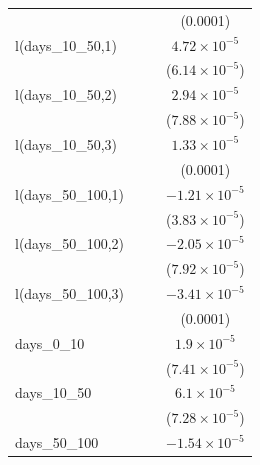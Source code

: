 \begin{tabular}{lccc}
                                          &          &                       & (0.0001)\\   
   l(days\_10\_50,1)                      &          &                       & $4.72\times 10^{-5}$\\    
                                          &          &                       & ($6.14\times 10^{-5}$)\\    
   l(days\_10\_50,2)                      &          &                       & $2.94\times 10^{-5}$\\    
                                          &          &                       & ($7.88\times 10^{-5}$)\\    
   l(days\_10\_50,3)                      &          &                       & $1.33\times 10^{-5}$\\    
                                          &          &                       & (0.0001)\\   
   l(days\_50\_100,1)                     &          &                       & $-1.21\times 10^{-5}$\\    
                                          &          &                       & ($3.83\times 10^{-5}$)\\    
   l(days\_50\_100,2)                     &          &                       & $-2.05\times 10^{-5}$\\    
                                          &          &                       & ($7.92\times 10^{-5}$)\\    
   l(days\_50\_100,3)                     &          &                       & $-3.41\times 10^{-5}$\\    
                                          &          &                       & (0.0001)\\   
   days\_0\_10                            &          &                       & $1.9\times 10^{-5}$\\    
                                          &          &                       & ($7.41\times 10^{-5}$)\\    
   days\_10\_50                           &          &                       & $6.1\times 10^{-5}$\\    
                                          &          &                       & ($7.28\times 10^{-5}$)\\    
   days\_50\_100                          &          &                       & $-1.54\times 10^{-5}$\\    

\end{tabular}
